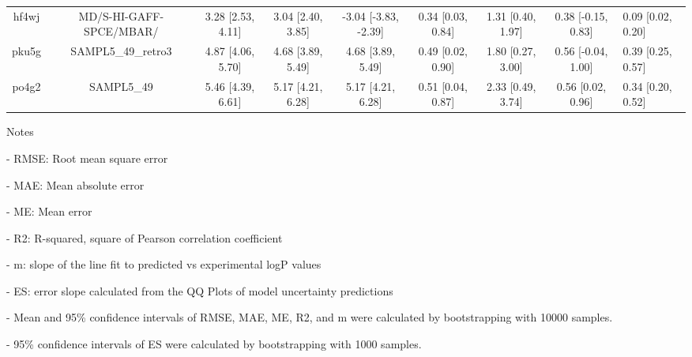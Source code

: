 \documentclass{article}
\begin{document}
\begin{center}
\begin{longtable}{|cccccccc|}
 hf4wj &                            MD/S-HI-GAFF-SPCE/MBAR/ &  3.28 [2.53, 4.11] &  3.04 [2.40, 3.85] &  -3.04 [-3.83, -2.39] &  0.34 [0.03, 0.84] &    1.31 [0.40, 1.97] &   0.38 [-0.15, 0.83] &     0.09 [0.02, 0.20] \\
 pku5g &                                 SAMPL5\_49\_retro3 &  4.87 [4.06, 5.70] &  4.68 [3.89, 5.49] &     4.68 [3.89, 5.49] &  0.49 [0.02, 0.90] &    1.80 [0.27, 3.00] &   0.56 [-0.04, 1.00] &     0.39 [0.25, 0.57] \\
 po4g2 &                                         SAMPL5\_49 &  5.46 [4.39, 6.61] &  5.17 [4.21, 6.28] &     5.17 [4.21, 6.28] &  0.51 [0.04, 0.87] &    2.33 [0.49, 3.74] &    0.56 [0.02, 0.96] &     0.34 [0.20, 0.52] \\
\end{longtable}
\end{center}

Notes

- RMSE: Root mean square error

- MAE: Mean absolute error

- ME: Mean error

- R2: R-squared, square of Pearson correlation coefficient

- m: slope of the line fit to predicted vs experimental logP values

- ES: error slope calculated from the QQ Plots of model uncertainty predictions

- Mean and 95\% confidence intervals of RMSE, MAE, ME, R2, and m were calculated by bootstrapping with 10000 samples.

- 95\% confidence intervals of ES were calculated by bootstrapping with 1000 samples.\end{document}
\end{document}
